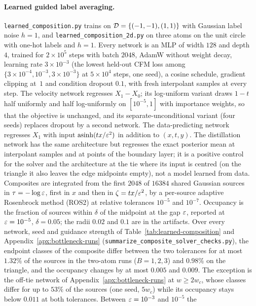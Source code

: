 \documentclass{article} %
\theoremstyle{plain}
\theoremstyle{definition}
\theoremstyle{remark}
\begin{document}
\paragraph{Learned guided label averaging.}
\label{app:learned-composition}
\texttt{learned\_composition.py} trains on $\mathcal{D}=\{(-1,-1),(1,1)\}$ with Gaussian label noise
$h=1$, and \texttt{learned\_composition\_2d.py} on three atoms on the unit circle with one-hot
labels and $h=1$. Every network is an MLP of width $128$ and depth $4$, trained for $2\times10^5$
steps with batch $2048$, AdamW without weight decay, learning rate $3\times10^{-3}$ (the lowest
held-out CFM loss among $\{3\times10^{-4},10^{-3},3\times10^{-3}\}$ at $5\times10^4$ steps, one
seed), a cosine schedule, gradient clipping at~$1$ and condition dropout $0.1$, with fresh
interpolant samples at every step. The velocity network regresses $X_1-X_0$; its log-uniform
variant draws $1-t$ half uniformly and half log-uniformly on $[10^{-5},1]$ with importance weights,
so that the objective is unchanged, and its separate-unconditional variant (four seeds) replaces
dropout by a second network. The data-predicting network regresses $X_1$ with input
$\operatorname{asinh}(tx/\varepsilon^2)$ in addition to $(x,t,y)$. The distillation network has the same
architecture but regresses the exact posterior mean at interpolant samples and at points of the
boundary layer; it is a positive control for the solver and the architecture at the tie where its
input is centred (on the triangle it also leaves the edge midpoints empty), not a model learned from
data. Composites are integrated from the first $2048$ of $16384$ shared Gaussian
sources in $\tau=-\log\varepsilon$, first in $x$ and then in $\zeta=tx/\varepsilon^2$, by a per-source adaptive
Rosenbrock method (ROS2) at relative tolerances $10^{-5}$ and $10^{-7}$. Occupancy is
the fraction of sources within $\delta$ of the midpoint at the gap $\varepsilon$, reported at
$\varepsilon=10^{-5}$, $\delta=0.05$; the radii $0.02$ and $0.1$ are in the artifacts. Over every
network, seed and guidance strength of Table~\ref{tab:learned-composition} and
Appendix~\ref{apx:bottleneck-runs} (\texttt{summarize\_composite\_solver\_checks.py}), the endpoint
classes of the composite differ between the two tolerances for at most $1.32\%$ of the sources in
the two-atom runs ($B=1,2,3$) and $0.98\%$ on the triangle, and the occupancy changes by at most
$0.005$ and $0.009$. The exception is the off-tie network of Appendix~\ref{apx:bottleneck-runs} at
$w\ge2w_c$, whose classes differ for up to $53\%$ of the sources (one seed, $5w_c$) while its
occupancy stays below $0.011$ at both tolerances. Between $\varepsilon=10^{-3}$ and $10^{-5}$ the
\end{document}
